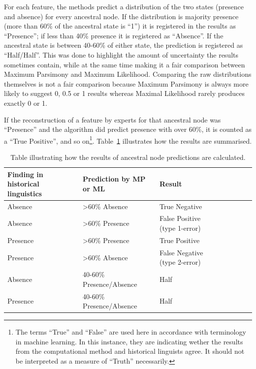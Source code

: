\documentclass[a4paper,10pt]{article} %
\begin{document}
For each feature, the methods predict a distribution of the two states (presence and absence) for every ancestral node. If the distribution is majority presence (more than 60\% of the ancestral state is ``1'') it is registered in the results as ``Presence''; if less than 40\% presence it is registered as ``Absence''. If the ancestral state is between 40-60\% of either state, the prediction is registered as ``Half/Half''. This was done to highlight the amount of uncertainty the results sometimes contain, while at the same time making it a fair comparison between Maximum Parsimony and Maximum Likelihood. Comparing the raw distributions themselves is not a fair comparison because Maximum Parsimony is always more likely to suggest 0, 0.5 or 1 results whereas Maximal Likelihood rarely produces exactly 0 or 1. 

If the reconstruction of a feature by experts for that ancestral node was ``Presence'' and the algorithm did predict presence with over 60\%, it is counted as a ``True Positive'', and so on\footnote{The terms ``True'' and ``False'' are used here in accordance with terminology in machine learning. In this instance, they are indicating wether the results from the computational method and historical linguists agree. It should not be interpreted as a measure of ``Truth'' necessarily.}. Table~\ref{example_HL_prediction_table_true_positives} illustrates how the results are summarised.

\begin{table}[H]
\centering
\caption{Table illustrating how the results of ancestral node predictions are calculated.}
\label{example_HL_prediction_table_true_positives}
\begin{tabular}{|l|l|l|l|l|l|l|l|}
\hline
\textbf{Finding in historical linguistics} & \textbf{Prediction by MP or ML} & \textbf{Result} \\ \hline
Absence & >60\% Absence & True Negative \\ \hline
Absence & >60\% Presence & False Positive (type 1-error) \\ \hline
Presence & >60\% Presence & True Positive \\ \hline
Presence & >60\% Absence & False Negative (type 2-error) \\ \hline
Absence & 40-60\% Presence/Absence & Half \\ \hline
Presence & 40-60\% Presence/Absence & Half\\ \hline
\end{tabular}
\end{table}
\end{document}
